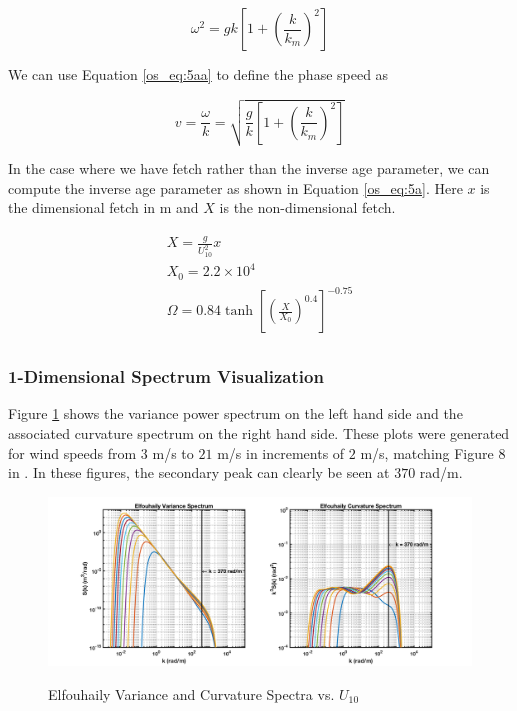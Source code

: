 \begin{equation}
\label{os_eq:5aa}
\omega^2 = gk\left[1 + \left(\frac{k}{k_m}\right)^2 \right]
\end{equation}

\noindent We can use Equation \ref{os_eq:5aa} to define the phase speed as

\begin{equation}
\label{os_eq:5ab}
v = \frac{\omega}{k}= \sqrt{\frac{g}{k}\left[1 + \left(\frac{k}{k_m}\right)^2 \right]}
\end{equation}

In the case where we have fetch rather than the inverse age parameter, we can compute the inverse age parameter as shown in Equation \ref{os_eq:5a}. Here $x$ is the dimensional fetch in m and $X$ is the non-dimensional fetch.

\begin{equation}
\label{os_eq:5a}
\begin{gathered}
 X = \frac{g}{U_{10}^2}x\\
 X_0 = 2.2 \times 10^4 \\
 \Omega = 0.84\tanh\left[\left(\frac{X}{X_0} \right)^{0.4} \right]^{-0.75} \\
\end{gathered}
\end{equation}
\renewcommand{\baselinestretch}{2} \small\normalsize

\subsubsection{1-Dimensional Spectrum Visualization}
Figure \ref{os_fig:3} shows the variance power spectrum on the left hand side and the associated curvature spectrum on the right hand side. These plots were generated for wind speeds from $3$ m/s to $21$ m/s in increments of $2$ m/s, matching Figure 8 in \cite{elfouhaily}. In these figures, the secondary peak can clearly be seen at $370$ rad/m.

\begin{figure}[H]
  \begin{center}
\includegraphics[width=6in]{../media/Ocean_Surface/elf_variance_curvature_spectrum.png}
  \end{center}
  \renewcommand{\baselinestretch}{1} \small\normalsize
  \begin{quote}
    \caption[Elfouhaily Variance and Curvature Spectra vs. $U_{10}$]{Elfouhaily Variance and Curvature Spectra vs. $U_{10}$\label{os_fig:3}}
  \end{quote}
\end{figure}
\renewcommand{\baselinestretch}{2} \small\normalsize

